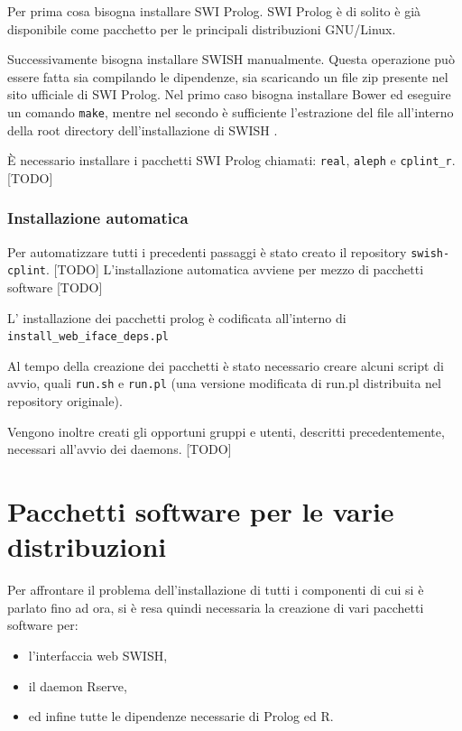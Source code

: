 \documentclass[10pt,titlepage,twoside,a4paper]{report}
\begin{document}
Per prima cosa bisogna installare SWI Prolog. SWI Prolog è di 
solito è già disponibile come pacchetto per le principali distribuzioni 
GNU/Linux.

Successivamente bisogna installare SWISH manualmente. Questa operazione può 
essere fatta sia compilando le dipendenze, sia scaricando un file zip presente 
nel sito ufficiale di SWI Prolog. Nel primo caso bisogna installare Bower 
\cite{bower} ed eseguire un comando \texttt{make}, mentre nel secondo è 
sufficiente l'estrazione del file all'interno della root directory 
dell'installazione di SWISH \cite{swishManualInstallation}.

È necessario installare i pacchetti SWI Prolog chiamati: \texttt{real}, 
\texttt{aleph} e \texttt{cplint\_r}. [TODO]

        \subsection{Installazione automatica}
Per automatizzare tutti i precedenti passaggi è stato creato il repository
\texttt{swish-cplint}. [TODO] L'installazione automatica avviene per mezzo di 
pacchetti software [TODO]

L' installazione dei pacchetti prolog è codificata all'interno di 
\texttt{install\_web\_iface\_deps.pl}

Al tempo della creazione dei pacchetti è stato necessario creare alcuni
script di avvio, quali \texttt{run.sh} e \texttt{run.pl} (una versione 
modificata di run.pl distribuita nel repository originale).

Vengono inoltre creati gli opportuni gruppi e utenti, descritti 
precedentemente, necessari all'avvio dei daemons. [TODO]


\chapter{Pacchetti software per le varie distribuzioni} 
\label{ch:pacchetti-software-per-le-varie-distribuzioni}
Per affrontare il problema dell'installazione di tutti i componenti di cui si 
è parlato fino ad ora, si è resa quindi necessaria la creazione di vari 
pacchetti software per:
\begin{itemize}
    \item l'interfaccia web SWISH,
    \item il daemon Rserve,
    \item ed infine tutte le dipendenze necessarie di Prolog ed R.
\end{itemize}
\end{document}
